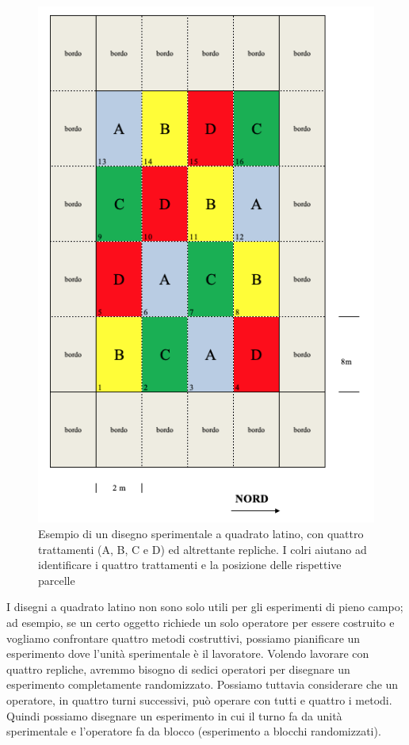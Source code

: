\documentclass[a4paper,12pt,oneside]{book}
\begin{document}
\begin{figure}

{\centering \includegraphics[width=0.7\linewidth]{_images/Mappa2LS} 

}

\caption{Esempio di un disegno sperimentale a quadrato latino, con quattro trattamenti (A, B, C e D) ed altrettante repliche. I colri aiutano ad identificare i quattro trattamenti e la posizione delle rispettive parcelle}\label{fig:figName35}
\end{figure}

I disegni a quadrato latino non sono solo utili per gli esperimenti di pieno campo; ad esempio, se un certo oggetto richiede un solo operatore per essere costruito e vogliamo confrontare quattro metodi costruttivi, possiamo pianificare un esperimento dove l'unità sperimentale è il lavoratore. Volendo lavorare con quattro repliche, avremmo bisogno di sedici operatori per disegnare un esperimento completamente randomizzato. Possiamo tuttavia considerare che un operatore, in quattro turni successivi, può operare con tutti e quattro i metodi. Quindi possiamo disegnare un esperimento in cui il turno fa da unità sperimentale e l'operatore fa da blocco (esperimento a blocchi randomizzati).
\end{document}
